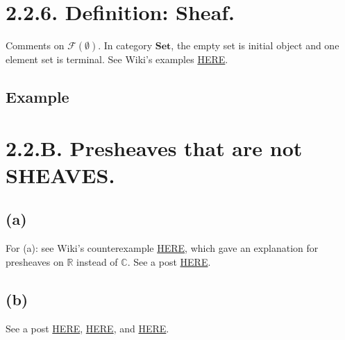 \section{2.2.6. Definition: Sheaf.}

Comments on $\mathscr{F} (\emptyset)$. In category $\textbf{Set}$, the empty set is initial object and one element set is terminal. See Wiki's examples \href{https://en.wikipedia.org/wiki/Initial_and_terminal_objects#:~:text=Similarly%2C%20the%20empty%20space%20is,hence%20the%20unique%20zero%20object.}{HERE}.

\subsection{Example}

\section{2.2.B. Presheaves that are not SHEAVES.}

\subsection{(a)}
For (a): see Wiki's counterexample \href{https://en.wikipedia.org/wiki/Sheaf_(mathematics)}{HERE}, which gave an explanation for presheaves on $\mathbb R$ instead of $\mathbb C$.
See a post \href{https://math.stackexchange.com/questions/2946197/why-is-the-bounded-functions-not-a-sheaf}{HERE}.

\subsection{(b)}

See a post \href{https://math.stackexchange.com/questions/38423/presheaf-which-is-not-a-sheaf-holomorphic-functions-which-admit-a-holomorphic}{HERE}, \href{https://math.stackexchange.com/questions/1372943/do-analytic-functions-on-open-subsets-of-mathbbc-with-an-analytic-square-ro}{HERE}, and \href{https://math.stackexchange.com/questions/1938930/why-is-the-presheaf-of-holomorphic-functions-that-admit-a-square-root-not-a-shea}{HERE}.

